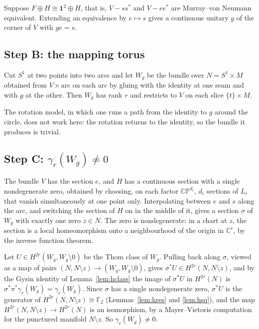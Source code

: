 \documentclass[11pt]{amsart}
\theoremstyle{plain}
\theoremstyle{definition}
\newcommand{\F}{\mathbb F}
\newcommand{\C}{\mathbb C}
\newcommand{\CP}{\mathbb{CP}}
\begin{document}
Suppose $F \oplus H \cong \mathbf 1^2 \oplus H$, that is, $V - ss^{*}$ and
$V - ee^{*}$ are Murray--von Neumann equivalent.  Extending an equivalence by
$e \mapsto s$ gives a continuous unitary $g$ of the corner of $V$ with
$g e = s$.

\subsection{Step B: the mapping torus}

Cut $S^1$ at two points into two arcs and let $W_g$ be the bundle over
$N = S^1 \times M$ obtained from $V \times \mathrm{arc}$ on each arc by gluing
with the identity at one seam and with $g$ at the other.  Then $W_g$ has rank
$r$ and restricts to $V$ on each slice $\{t\} \times M$.

The rotation model, in which one runs a path from the identity to $g$ around
the circle, does not work here: the rotation returns to the identity, so the
bundle it produces is trivial.

\subsection{Step C: $\gamma_r(W_g) \neq 0$}

The bundle $V$ has the section $e$, and $H$ has a continuous section with a
single nondegenerate zero, obtained by choosing, on each factor $\CP^{d_i}$,
$d_i$ sections of $L_i$ that vanish simultaneously at one point only.
Interpolating between $e$ and $s$ along the arc, and switching the section of
$H$ on in the middle of it, gives a section $\sigma$ of $W_g$ with exactly one
zero $z \in N$.  The zero is nondegenerate: in a chart at $z$, the section is a
local homeomorphism onto a neighbourhood of the origin in $\C^r$, by the
inverse function theorem.

Let $U \in H^{2r}(W_g, W_g \setminus 0)$ be the Thom class of $W_g$.  Pulling
back along $\sigma$, viewed as a map of pairs $(N, N \setminus z) \to
(W_g, W_g \setminus 0)$, gives $\sigma^{*}U \in H^{2r}(N, N \setminus z)$, and
by the Gysin identity of Lemma~\ref{lem:hclass} the image of $\sigma^{*}U$
in $H^{2r}(N)$ is $\sigma^{*}\pi^{*}\gamma_r(W_g) = \gamma_r(W_g)$.  Since
$\sigma$ has a single nondegenerate zero, $\sigma^{*}U$ is the generator of
$H^{2r}(N, N \setminus z) \cong \F_2$ (Lemmas~\ref{lem:hres} and
\ref{lem:hsq}), and the map $H^{2r}(N, N \setminus z) \to H^{2r}(N)$ is an
isomorphism, by a Mayer--Vietoris computation for the punctured manifold
$N \setminus z$.  So $\gamma_r(W_g) \neq 0$.
\end{document}
